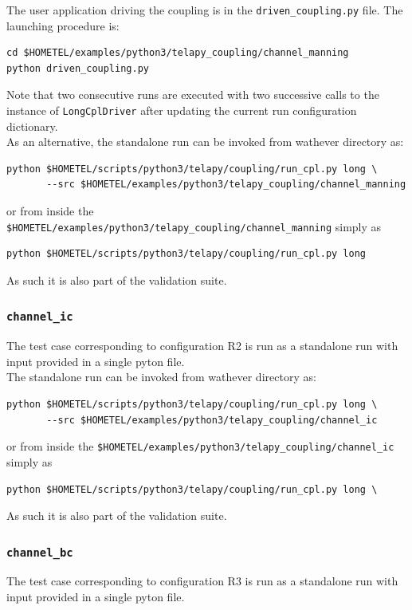 The user application driving the coupling is in the
\texttt{driven\_coupling.py} file. The launching procedure is:
\begin{verbatim}
cd $HOMETEL/examples/python3/telapy_coupling/channel_manning
python driven_coupling.py
\end{verbatim}
Note that two consecutive runs are executed with two successive
calls to the instance of \texttt{LongCplDriver} after updating the
current run configuration dictionary.\\

As an alternative, the standalone run can be invoked from wathever
directory as:
\begin{verbatim}
python $HOMETEL/scripts/python3/telapy/coupling/run_cpl.py long \
       --src $HOMETEL/examples/python3/telapy_coupling/channel_manning
\end{verbatim}
or from inside the
\texttt{\$HOMETEL/examples/python3/telapy\_coupling/channel\_manning}
simply as
\begin{verbatim}
python $HOMETEL/scripts/python3/telapy/coupling/run_cpl.py long
\end{verbatim}
As such it is also part of the validation suite.

\subsubsection{\texttt{channel\_ic}}
The test case corresponding to configuration R2 is run as a standalone
run with input provided in a single pyton file.\\

The standalone run can be invoked from wathever
directory as:
\begin{verbatim}
python $HOMETEL/scripts/python3/telapy/coupling/run_cpl.py long \
       --src $HOMETEL/examples/python3/telapy_coupling/channel_ic
\end{verbatim}
or from inside the
\texttt{\$HOMETEL/examples/python3/telapy\_coupling/channel\_ic}
simply as
\begin{verbatim}
python $HOMETEL/scripts/python3/telapy/coupling/run_cpl.py long \
\end{verbatim}
As such it is also part of the validation suite.

\subsubsection{\texttt{channel\_bc}}
The test case corresponding to configuration R3 is run as a standalone
run with input provided in a single pyton file.\\

